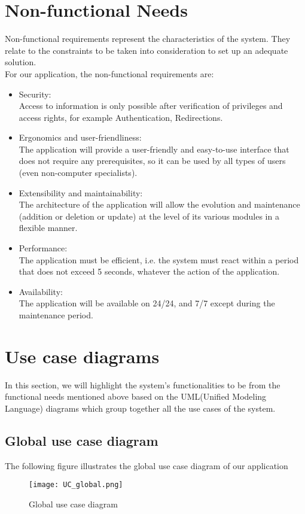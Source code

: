\section{Non-functional Needs}
Non-functional requirements represent the characteristics of the system.
They relate to the constraints to be taken into consideration to set up
an adequate solution.\\
For our application, the non-functional requirements are:
\begin{itemize}
\item Security:\\
Access to information is only possible after verification of privileges and access rights,
for example Authentication, Redirections.

\item Ergonomics and user-friendliness:\\
The application will provide a user-friendly and easy-to-use interface that does not
require any prerequisites, so it can be used by all types of users (even non-computer specialists).

\item Extensibility and maintainability:\\
The architecture of the application will allow the evolution and maintenance (addition
or deletion or update) at the level of its various modules in a flexible manner.

\item Performance:\\
The application must be efficient, i.e. the system must react within a period that does
not exceed 5 seconds, whatever the action of the application.

\item Availability:\\
The application will be available on 24/24, and 7/7 except during the maintenance period.

\end{itemize}
\section{Use case diagrams}
In this section, we will highlight the system's functionalities to be
from the functional needs mentioned above based on the UML(Unified Modeling Language) diagrams which group together all the use cases of the system.
\subsection{Global use case diagram}
The following figure illustrates the global use case diagram of our application
\begin{figure}[H]%
    \center   
    \texttt{[image: UC\_global.png]}
    \caption{Global use case diagram}
\end{figure}
